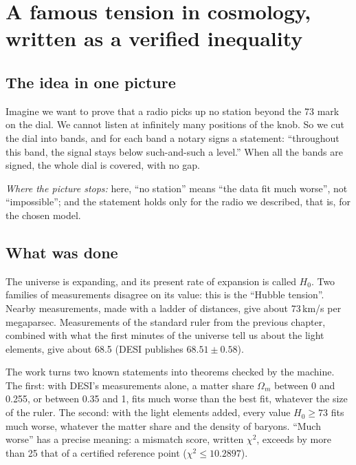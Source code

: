 \chapter[A tension written as an inequality]{A famous tension in cosmology, written as a verified inequality}

\section*{The idea in one picture}

\begin{analogie}
Imagine we want to prove that a radio picks up no station beyond the 73 mark on the dial. We cannot listen at
infinitely many positions of the knob. So we cut the dial into bands, and for each band a notary signs a statement:
``throughout this band, the signal stays below such-and-such a level.'' When all the bands are signed, the whole dial
is covered, with no gap.

\emph{Where the picture stops:} here, ``no station'' means ``the data fit much worse'', not ``impossible''; and the
statement holds only for the radio we described, that is, for the chosen model.
\end{analogie}

\section*{What was done}

The universe is expanding, and its present rate of expansion is called $H_0$. Two families of measurements disagree
on its value: this is the ``Hubble tension''. Nearby measurements, made with a ladder of distances, give about
73\,km/s per megaparsec. Measurements of the standard ruler from the previous chapter, combined with what the first
minutes of the universe tell us about the light elements, give about 68.5 (DESI publishes $68.51\pm0.58$).

The work turns two known statements into theorems checked by the machine. The first: with DESI's measurements alone,
a matter share $\Omega_m$ between 0 and 0.255, or between 0.35 and 1, fits much worse than the best fit, whatever the
size of the ruler. The second: with the light elements added, every value $H_0\ge73$ fits much worse, whatever the
matter share and the density of baryons. ``Much worse'' has a precise meaning: a mismatch score, written $\chi^2$,
exceeds by more than 25 that of a certified reference point ($\chi^2\le10.2897$).

